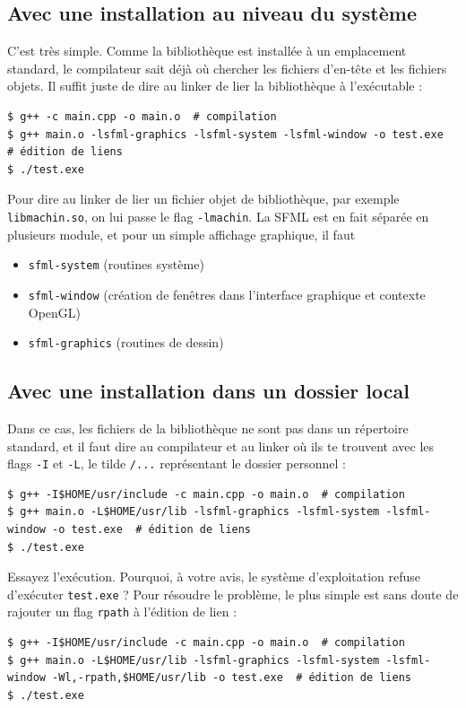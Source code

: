 \documentclass{book}
\def\filename{\texttt}
\begin{document}
\subsection{Avec une installation au niveau du système}

C'est très simple. Comme la bibliothèque est installée à un emplacement standard, le compilateur sait déjà où chercher les fichiers d'en-tête et les fichiers objets. Il suffit juste de dire au linker de lier la bibliothèque à l'exécutable :

\begin{verbatim}
$ g++ -c main.cpp -o main.o  # compilation
$ g++ main.o -lsfml-graphics -lsfml-system -lsfml-window -o test.exe  # édition de liens
$ ./test.exe
\end{verbatim}

Pour dire au linker de lier un fichier objet de bibliothèque, par exemple \filename{libmachin.so}, on lui passe le flag \texttt{-lmachin}. La SFML est en fait séparée en plusieurs module, et pour un simple affichage graphique, il faut
\begin{itemize}
  \item \texttt{sfml-system} (routines système)
  \item \texttt{sfml-window} (création de fenêtres dans l'interface graphique et contexte OpenGL)
  \item \texttt{sfml-graphics} (routines de dessin)
\end{itemize}

\subsection{Avec une installation dans un dossier local}

Dans ce cas, les fichiers de la bibliothèque ne sont pas dans un répertoire standard, et il faut dire au compilateur et au linker où ils te trouvent avec les flags \texttt{-I} et \texttt{-L}, le tilde \texttt{\raisebox{0.5ex}{\texttildelow}/...} représentant le dossier personnel :

\begin{verbatim}
$ g++ -I$HOME/usr/include -c main.cpp -o main.o  # compilation
$ g++ main.o -L$HOME/usr/lib -lsfml-graphics -lsfml-system -lsfml-window -o test.exe  # édition de liens
$ ./test.exe
\end{verbatim}

Essayez l'exécution. Pourquoi, à votre avis, le système d'exploitation refuse d'exécuter \filename{test.exe} ? Pour résoudre le problème, le plus simple est sans doute de rajouter un flag \texttt{rpath} à l'édition de lien :
\begin{verbatim}
$ g++ -I$HOME/usr/include -c main.cpp -o main.o  # compilation
$ g++ main.o -L$HOME/usr/lib -lsfml-graphics -lsfml-system -lsfml-window -Wl,-rpath,$HOME/usr/lib -o test.exe  # édition de liens
$ ./test.exe
\end{verbatim}
\end{document}
